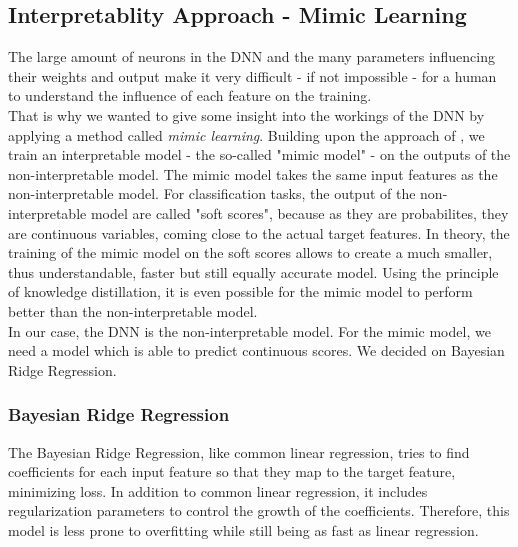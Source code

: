 \documentclass[conference,comsoc]{IEEEtran}
\begin{document}
\subsection{Interpretablity Approach - Mimic Learning}
The large amount of neurons in the DNN and the many parameters influencing their weights and output make it very difficult - if not impossible - for a human to understand the influence of each feature on the training. \\
That is why we wanted to give some insight into the workings of the DNN by applying a method called \emph{mimic learning}. 
Building upon the approach of \cite{Che2016}, we train an interpretable model - the so-called "mimic model" - on the outputs of the non-interpretable model.
The mimic model takes the same input features as the non-interpretable model.
For classification tasks, the output of the non-interpretable model are called "soft scores", because as they are probabilites, they are continuous variables, coming close to the actual target features.
In theory, the training of the mimic model on the soft scores allows to create a much smaller, thus understandable, faster but still equally accurate model.
Using the principle of knowledge distillation, it is even possible for the mimic model to perform better than the non-interpretable model. \\
In our case, the DNN is the non-interpretable model.
For the mimic model, we need a model which is able to predict continuous scores.
We decided on Bayesian Ridge Regression.
\subsubsection{Bayesian Ridge Regression}
The Bayesian Ridge Regression, like common linear regression, tries to find coefficients for each input feature so that they map to the target feature, minimizing loss.
In addition to common linear regression, it includes regularization parameters to control the growth of the coefficients.
Therefore, this model is less prone to overfitting while still being as fast as linear regression.
\end{document}
